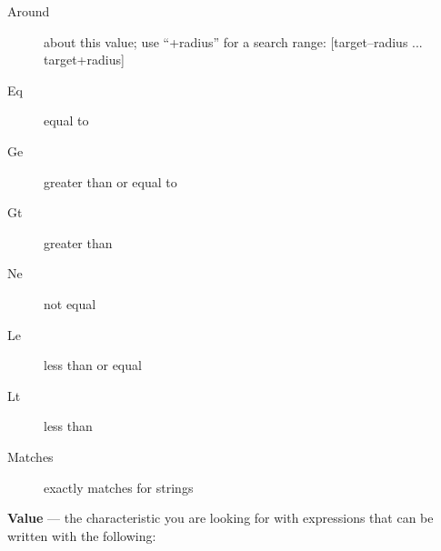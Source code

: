 \begin{description}
\begin{description}
        \item[Around]	about this value; use “+radius” for a search range: [target–radius ...  target+radius]
        \item[Eq	]	equal to
        \item[Ge]	greater than or equal to
        \item[Gt]	greater than
        \item[Ne]not equal
        \item[Le]	less than or equal
        \item[Lt] less than
        \item[Matches]	exactly matches for strings
    \end{description}
\end{description}

\textbf{Value} --- the characteristic you are looking for with expressions that can be written with the following:

